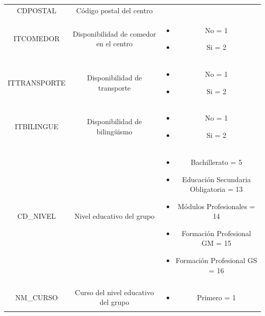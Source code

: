 \begin{subappendices}
\begin{table}[!ht]
{\begin{tabular}{|c|c|c|}
\begin{minipage}[t]{0.4\textwidth}
			\end{minipage} \\ 
			\hline 
			CDPOSTAL & Código postal del centro &  \\ 
			\hline 
			ITCOMEDOR & Disponibilidad de comedor en el centro &  		\begin{minipage}[t]{0.4\textwidth}
				\begin{itemize}
					\item No = 1
					\item Si = 2
				\end{itemize}
			\end{minipage}\\ 
			\hline 
			ITTRANSPORTE & Disponibilidad de transporte & \begin{minipage}[t]{0.4\textwidth}
				\begin{itemize}
					\item No = 1
					\item Si = 2
				\end{itemize}
			\end{minipage}\\ 
			\hline 
			ITBILINGUE & Disponibilidad de bilingüismo & \begin{minipage}[t]{0.4\textwidth}
				\begin{itemize}
					\item No = 1
					\item Si = 2
				\end{itemize}
			\end{minipage}\\ 
			\hline 
			CD\_NIVEL & Nivel educativo del grupo &    
			\begin{minipage}[t]{0.4\textwidth}
				\begin{itemize}
					\item Bachillerato = 5
					\item Educación Secundaria Obligatoria = 13
					\item Módulos Profesionales = 14
					\item Formación Profesional GM = 15
					\item Formación Profesional GS = 16
				\end{itemize}
			\end{minipage}\\ 
			\hline 
			NM\_CURSO & Curso del nivel educativo del grupo &  
			\begin{minipage}[t]{0.4\textwidth}
				\begin{itemize}
					\item Primero = 1

\end{itemize}
\end{minipage}
\end{tabular}}
\end{table}
\end{subappendices}
